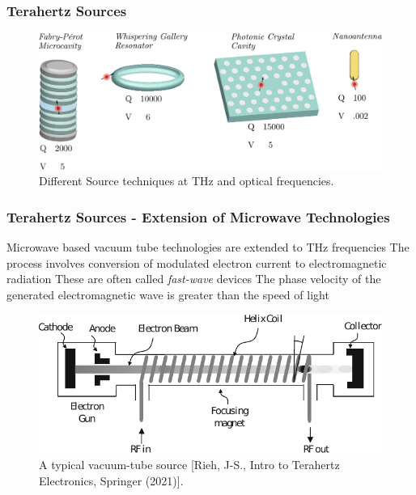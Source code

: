 \documentclass[10pt]{beamer}
\begin{document}
\begin{frame}
    \frametitle{Terahertz Sources}

    \begin{figure}[h!]
        \centering
        \includegraphics[width=.75\textwidth]{Curto_resonator.pdf}
        \caption{Different Source techniques at THz and optical frequencies.}
    \end{figure}


\end{frame}

\begin{frame}
    \frametitle{Terahertz Sources - Extension of Microwave Technologies}
    \small
    \begin{outline}
        \1 Microwave based vacuum tube technologies are extended to THz frequencies
        \2 The process involves conversion of modulated electron current to electromagnetic radiation
        \2 These are often called \textit{fast-wave} devices
        \2 The phase velocity of the generated electromagnetic wave is greater than the speed of light
    \end{outline}
    \begin{figure}[h!]
        \centering
        \includegraphics[width=.65\textwidth]{electron_gun.pdf}
        \caption{A typical vacuum-tube source \tiny{[Rieh, J-S.,  Intro to Terahertz Electronics, Springer (2021)]}.}
    \end{figure}
\end{frame}
\end{document}
